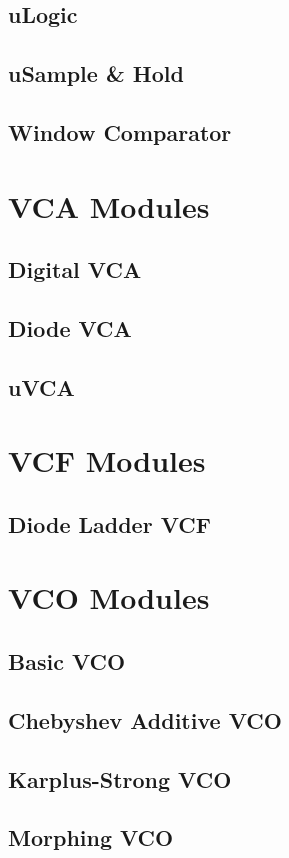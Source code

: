 \documentclass[11pt]{book}
\begin{document}
\section{uLogic}
\section{uSample \& Hold}
\section{Window Comparator}

\chapter{VCA Modules}
\section{Digital VCA}
\section{Diode VCA}
\section{uVCA}

\chapter{VCF Modules}
\section{Diode Ladder VCF}

\chapter{VCO Modules}
\section{Basic VCO}
\section{Chebyshev Additive VCO}
\section{Karplus-Strong VCO}
\section{Morphing VCO}
\end{document}
